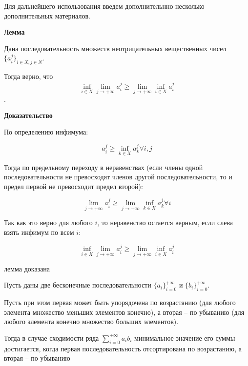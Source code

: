 

Для дальнейшего использования введем дополнительнно несколько дополнительных материалов.

\textbf{Лемма}

Дана последовательность множеств неотрицательных вещественных чисел $\{a_i^j\}_{i \in X, j \in N}$.

Тогда верно, что $$\inf_{i \in X} \lim_{j \to +\infty} a_i^j \ge \lim_{j \to +\infty} \inf_{i \in X} a_i^j$$.

\textbf{Доказательство}

По определению инфимума:

$$a_i^j \ge \inf_{k \in X} a_k^j \forall i, j$$

Тогда по предельному переходу в неравенствах (если члены одной последовательности не превосходят членов другой последовательности, то и предел первой не превосходит предел второй):

$$\lim_{j \to +\infty} a_i^j \ge \lim_{j \to +\infty} \inf_{k \in X} a_k^j \forall i$$

Так как это верно для любого $i$, то неравенство остается верным, если слева взять инфимум по всем $i$:

$$\inf_{i \in X} \lim_{j \to +\infty} a_i^j \ge \lim_{j \to +\infty} \inf_{i \in X} a_i^j$$

лемма доказана

\newtheorem{theorem}{Теорема}
\begin{myth}
Пусть даны две бесконечные последовательности $\{a_i\}_{i = 0}^{+\infty}$ и $\{b_i\}_{i = 0}^{+\infty}$.

Пусть при этом первая может быть упорядочена по возрастанию (для любого элемента множество меньших элементов конечно), а вторая -- по убыванию (для любого элемента конечно множество больших элементов).

Тогда в случае сходимости ряда $\sum_{i = 0}^{+\infty} a_i b_i$ минимальное значение его суммы достигается, когда первая последовательность отсортирована по возрастанию, а вторая -- по убыванию
\end{myth}

